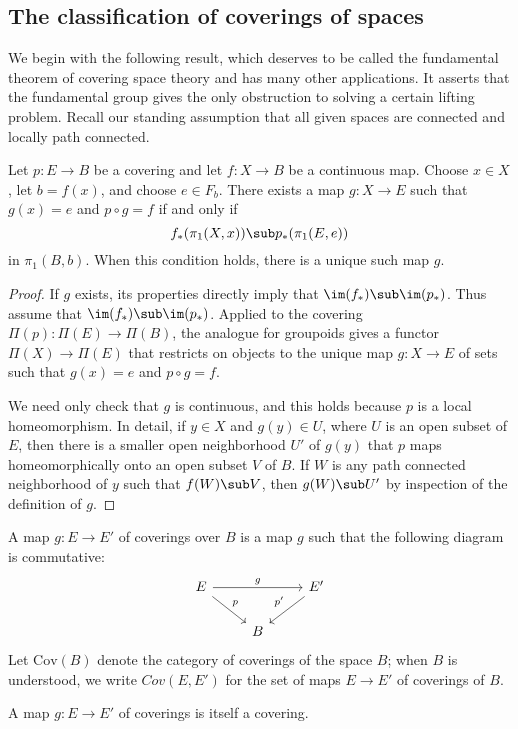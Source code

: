 \subsection{The classification of coverings of spaces}
We begin with the following result, which deserves to be called the fundamental theorem of covering space theory and has many other applications. It asserts that the fundamental group gives the only obstruction to solving a certain lifting problem. Recall our standing assumption that all given spaces are connected and locally path connected.
\begin{theorem}
Let $p:E\to B$ be a covering and let $f:X\to B$ be a continuous map. Choose $x\in X$, let $b=f(x)$, and choose $e\in F_b$. There exists a map $g:X\to E$ such that $g(x)=e$ and $p\circ g=f$ if and only if
\[f_*(\pi_1(X,x))\sub p_*(\pi_1(E,e))\]
in $\pi_1(B,b)$. When this condition holds, there is a unique such map $g$.
\end{theorem}
\begin{proof}
If $g$ exists, its properties directly imply that $\im(f_*)\sub\im(p_*)$. Thus
assume that $\im(f_*)\sub\im(p_*)$. Applied to the covering $\Pi(p):\Pi(E)\to\Pi(B)$, the analogue for groupoids gives a functor $\Pi(X)\to\Pi(E)$ that restricts on objects to the unique map $g:X\to E$ of sets such that $g(x)=e$ and $p\circ g=f$.\par
We need only check that $g$ is continuous, and this holds because $p$ is a local homeomorphism. In detail, if $y\in X$ and $g(y)\in U$, where $U$ is an open subset of $E$, then there is a smaller open neighborhood $U'$ of $g(y)$ that $p$ maps homeomorphically onto an open subset $V$ of $B$. If $W$ is any path connected neighborhood of $y$ such that $f(W)\sub V$, then $g(W)\sub U'$ by inspection of the definition of $g$.
\end{proof}
\begin{definition}
A map $g:E\to E'$ of coverings over $B$ is a map $g$ such that the following diagram is commutative:
\[\begin{tikzcd}
E\ar[rd,"p"]\ar[rr,"g"]&&E'\ar[ld,swap,"p'"]\\
&B&
\end{tikzcd}\]
Let $\mathrm{Cov}(B)$ denote the category of coverings of the space $B$; when $B$ is understood, we write $Cov(E,E')$ for the set of maps $E\to E'$ of coverings of $B$.
\end{definition}
\begin{lemma}
A map $g:E\to E'$ of coverings is itself a covering.
\end{lemma}
